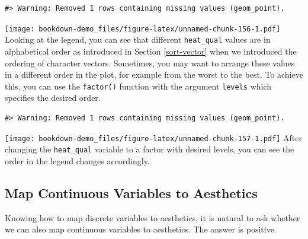 \documentclass[
]{book}
\newenvironment{Shaded}{\begin{snugshade}}{\end{snugshade}}
\newcommand{\AttributeTok}[1]{\textcolor[rgb]{0.77,0.63,0.00}{#1}}
\newcommand{\DecValTok}[1]{\textcolor[rgb]{0.00,0.00,0.81}{#1}}
\newcommand{\FunctionTok}[1]{\textcolor[rgb]{0.00,0.00,0.00}{#1}}
\newcommand{\NormalTok}[1]{#1}
\newcommand{\OtherTok}[1]{\textcolor[rgb]{0.56,0.35,0.01}{#1}}
\newcommand{\SpecialCharTok}[1]{\textcolor[rgb]{0.00,0.00,0.00}{#1}}
\newcommand{\StringTok}[1]{\textcolor[rgb]{0.31,0.60,0.02}{#1}}
\begin{document}
\begin{verbatim}
#> Warning: Removed 1 rows containing missing values (geom_point).
\end{verbatim}

\texttt{[image: bookdown-demo\_files/figure-latex/unnamed-chunk-156-1.pdf]}
Looking at the legend, you can see that different \texttt{heat\_qual} values are in alphabetical order as introduced in Section \ref{sort-vector} when we introduced the ordering of character vectors. Sometimes, you may want to arrange these values in a different order in the plot, for example from the worst to the best. To achieve this, you can use the \texttt{factor()} function with the argument \texttt{levels} which specifies the desired order.

\begin{Shaded}
\end{Shaded}

\begin{verbatim}
#> Warning: Removed 1 rows containing missing values (geom_point).
\end{verbatim}

\texttt{[image: bookdown-demo\_files/figure-latex/unnamed-chunk-157-1.pdf]}
After changing the \texttt{heat\_qual} variable to a factor with desired levels, you can see the order in the legend changes accordingly.

\hypertarget{map-continous-aes}{%
\subsection{Map Continuous Variables to Aesthetics}\label{map-continous-aes}}

Knowing how to map discrete variables to aesthetics, it is natural to ask whether we can also map continuous variables to aesthetics. The answer is positive.
\end{document}
